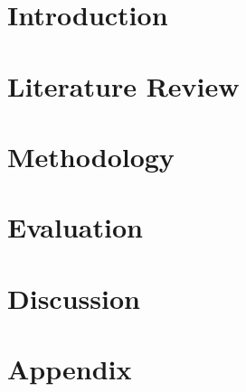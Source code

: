 \documentclass[12pt]{report}
\begin{document}


\begin{abstract}

\end{abstract}

\renewcommand{\abstractname}{Acknowledgements}
\begin{abstract}
 
\end{abstract}

\tableofcontents


\chapter{Introduction}


\chapter{Literature Review}


\chapter{Methodology}


\chapter{Evaluation}


\chapter{Discussion}





\chapter{Appendix}
\end{document}
